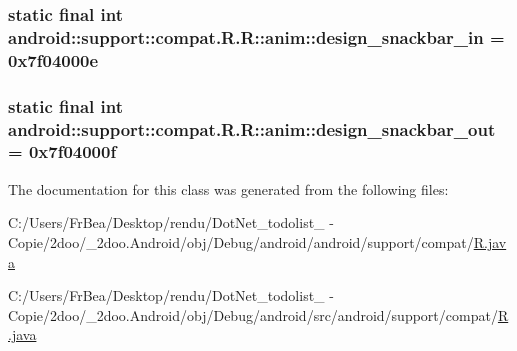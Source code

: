 \hypertarget{classandroid_1_1support_1_1compat_1_1_r_1_1anim_579ff2378320b4496de45e964290be13}{
\subsubsection[{design\_\-snackbar\_\-in}]{\setlength{\rightskip}{0pt plus 5cm}static final int android::support::compat.R.R::anim::design\_\-snackbar\_\-in = 0x7f04000e}}
\label{classandroid_1_1support_1_1compat_1_1_r_1_1anim_579ff2378320b4496de45e964290be13}


\hypertarget{classandroid_1_1support_1_1compat_1_1_r_1_1anim_64be435c81e9486fd82b8973b83a5494}{
\subsubsection[{design\_\-snackbar\_\-out}]{\setlength{\rightskip}{0pt plus 5cm}static final int android::support::compat.R.R::anim::design\_\-snackbar\_\-out = 0x7f04000f}}
\label{classandroid_1_1support_1_1compat_1_1_r_1_1anim_64be435c81e9486fd82b8973b83a5494}




The documentation for this class was generated from the following files:\begin{CompactItemize}
\item 
C:/Users/FrBea/Desktop/rendu/DotNet\_\-todolist\_ - Copie/2doo/\_\-2doo.Android/obj/Debug/android/android/support/compat/\hyperlink{android_2support_2compat_2_r_8java}{R.java}\item 
C:/Users/FrBea/Desktop/rendu/DotNet\_\-todolist\_ - Copie/2doo/\_\-2doo.Android/obj/Debug/android/src/android/support/compat/\hyperlink{src_2android_2support_2compat_2_r_8java}{R.java}\end{CompactItemize}
